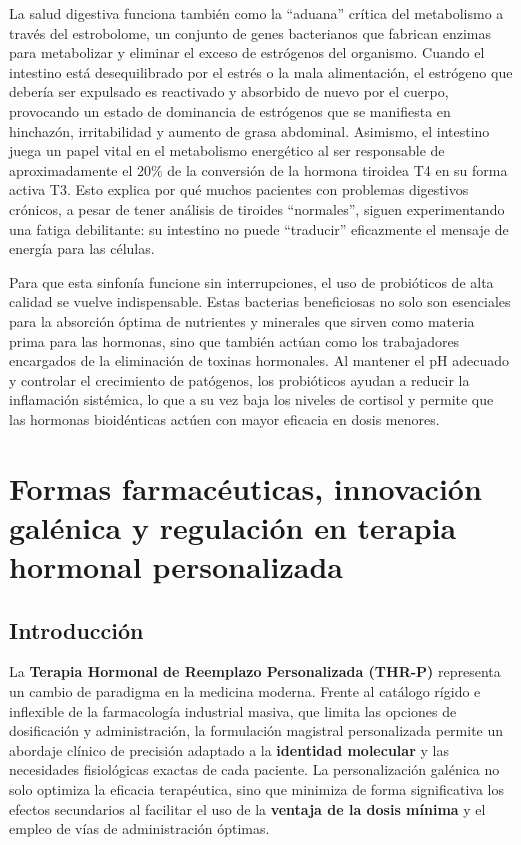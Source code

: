 \documentclass[
  spanish,
]{article}
\begin{document}
La salud digestiva funciona también como la ``aduana'' crítica del metabolismo a través del estrobolome, un conjunto de genes bacterianos que fabrican enzimas para metabolizar y eliminar el exceso de estrógenos del organismo. Cuando el intestino está desequilibrado por el estrés o la mala alimentación, el estrógeno que debería ser expulsado es reactivado y absorbido de nuevo por el cuerpo, provocando un estado de dominancia de estrógenos que se manifiesta en hinchazón, irritabilidad y aumento de grasa abdominal. Asimismo, el intestino juega un papel vital en el metabolismo energético al ser responsable de aproximadamente el 20\% de la conversión de la hormona tiroidea T4 en su forma activa T3. Esto explica por qué muchos pacientes con problemas digestivos crónicos, a pesar de tener análisis de tiroides ``normales'', siguen experimentando una fatiga debilitante: su intestino no puede ``traducir'' eficazmente el mensaje de energía para las células.

Para que esta sinfonía funcione sin interrupciones, el uso de probióticos de alta calidad se vuelve indispensable. Estas bacterias beneficiosas no solo son esenciales para la absorción óptima de nutrientes y minerales que sirven como materia prima para las hormonas, sino que también actúan como los trabajadores encargados de la eliminación de toxinas hormonales. Al mantener el pH adecuado y controlar el crecimiento de patógenos, los probióticos ayudan a reducir la inflamación sistémica, lo que a su vez baja los niveles de cortisol y permite que las hormonas bioidénticas actúen con mayor eficacia en dosis menores.

\section{Formas farmacéuticas, innovación galénica y regulación en terapia hormonal personalizada}\label{formas-farmacuxe9uticas-innovaciuxf3n-galuxe9nica-y-regulaciuxf3n-en-terapia-hormonal-personalizada}

\subsection{Introducción}\label{introducciuxf3n}

La \textbf{Terapia Hormonal de Reemplazo Personalizada (THR-P)} representa un cambio de paradigma en la medicina moderna. Frente al catálogo rígido e inflexible de la farmacología industrial masiva, que limita las opciones de dosificación y administración, la formulación magistral personalizada permite un abordaje clínico de precisión adaptado a la \textbf{identidad molecular} y las necesidades fisiológicas exactas de cada paciente. La personalización galénica no solo optimiza la eficacia terapéutica, sino que minimiza de forma significativa los efectos secundarios al facilitar el uso de la \textbf{ventaja de la dosis mínima} y el empleo de vías de administración óptimas.
\end{document}

